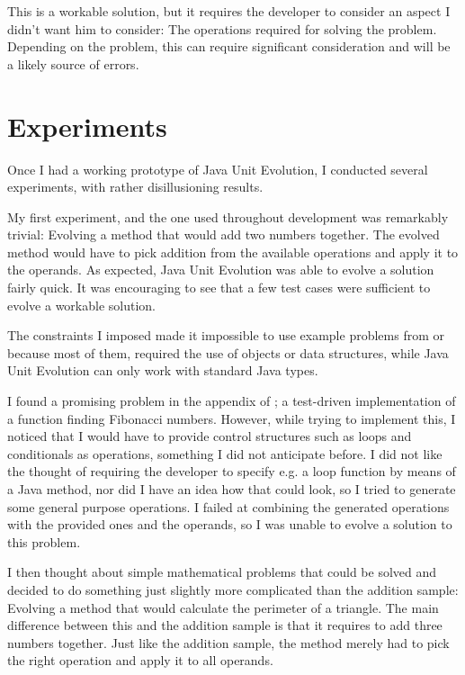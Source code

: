 \documentclass[a4paper]{article}
\begin{document}
This is a workable solution, but it requires the developer to consider
an aspect I didn't want him to consider: The operations required for
solving the problem. Depending on the problem, this can require
significant consideration and will be a likely source of errors.

\section{Experiments}

Once I had a working prototype of Java Unit Evolution, I conducted
several experiments, with rather disillusioning results.

My first experiment, and the one used throughout development was
remarkably trivial: Evolving a method that would add two numbers
together. The evolved method would have to pick addition from the
available operations and apply it to the operands. As expected, Java
Unit Evolution was able to evolve a solution fairly quick. It was
encouraging to see that a few test cases were sufficient to evolve a
workable solution.

The constraints I imposed made it impossible to use example problems
from \cite{koza1992} or \cite{beck2002} because most of them, required
the use of objects or data structures, while Java Unit Evolution can
only work with standard Java types.

I found a promising problem in the appendix of \cite{beck2002}; a
test-driven implementation of a function finding Fibonacci
numbers. However, while trying to implement this, I noticed that I
would have to provide control structures such as loops and
conditionals as operations, something I did not anticipate before. I
did not like the thought of requiring the developer to specify e.g. a
loop function by means of a Java method, nor did I have an idea how
that could look, so I tried to generate some general purpose
operations. I failed at combining the generated operations with the
provided ones and the operands, so I was unable to evolve a solution
to this problem.

I then thought about simple mathematical problems that could be solved
and decided to do something just slightly more complicated than the
addition sample: Evolving a method that would calculate the perimeter
of a triangle. The main difference between this and the addition
sample is that it requires to add three numbers together. Just like
the addition sample, the method merely had to pick the right operation
and apply it to all operands.
\end{document}
